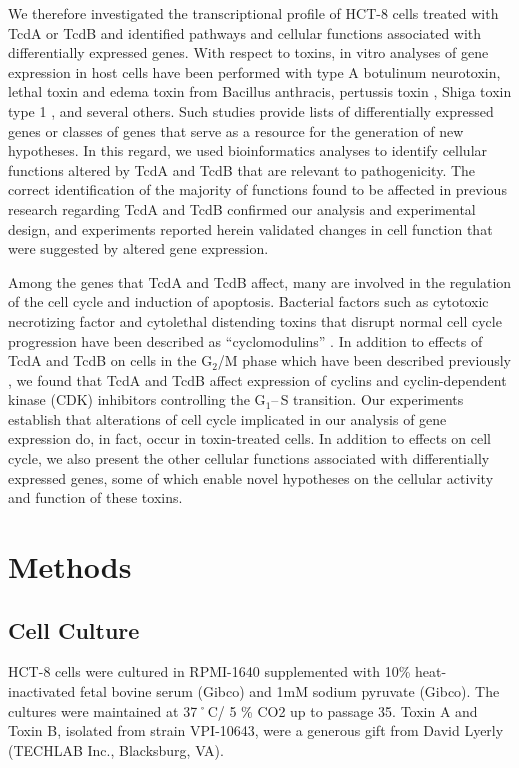 We therefore investigated the transcriptional profile of HCT-8 \cite{Tompkins:1974ud} cells treated with TcdA or TcdB and identified pathways and cellular functions associated with differentially expressed genes. With respect to toxins, in vitro analyses of gene expression in host cells have been performed with type A botulinum neurotoxin, lethal toxin \cite{Comer:2005iza} and edema toxin \cite{Comer:2006wta} from Bacillus anthracis, pertussis toxin \cite{Lu:2008cr}, Shiga toxin type 1 \cite{LeyvaIllades:2010fv}, and several others. Such studies provide lists of differentially expressed genes or classes of genes that serve as a resource for the generation of new hypotheses. In this regard, we used bioinformatics analyses to identify cellular functions altered by TcdA and TcdB that are relevant to pathogenicity. The correct identification of the majority of functions found to be affected in previous research regarding TcdA and TcdB confirmed our analysis and experimental design, and experiments reported herein validated changes in cell function that were suggested by altered gene expression.

Among the genes that TcdA and TcdB affect, many are involved in the regulation of the cell cycle and induction of apoptosis. Bacterial factors such as cytotoxic necrotizing factor and cytolethal distending toxins that disrupt normal cell cycle progression have been described as “cyclomodulins” \cite{Nougayrede:2005dm}. In addition to effects of TcdA and TcdB on cells in the G$_{\text{2}}$/M phase which have been described previously \cite{Fiorentini:1998uh,Kim:2005jk,Gerhard:2008wz,Nottrott:2007ep}, we found that TcdA and TcdB affect expression of cyclins and cyclin-dependent kinase (CDK) inhibitors controlling the G$_{\text{1}}$--\,S transition. Our experiments establish that alterations of cell cycle implicated in our analysis of gene expression do, in fact, occur in toxin-treated cells. In addition to effects on cell cycle, we also present the other cellular functions associated with differentially expressed genes, some of which enable novel hypotheses on the cellular activity and function of these toxins.

\section{Methods}

\subsection{Cell Culture}
HCT-8 cells were cultured in RPMI-1640 supplemented with 10\% heat-inactivated fetal bovine serum (Gibco) and 1mM sodium pyruvate (Gibco).  The cultures were maintained at 37˚C/ 5 \% CO2 up to passage 35. Toxin A and Toxin B, isolated from strain VPI-10643, were a generous gift from David Lyerly (TECHLAB Inc., Blacksburg, VA).


